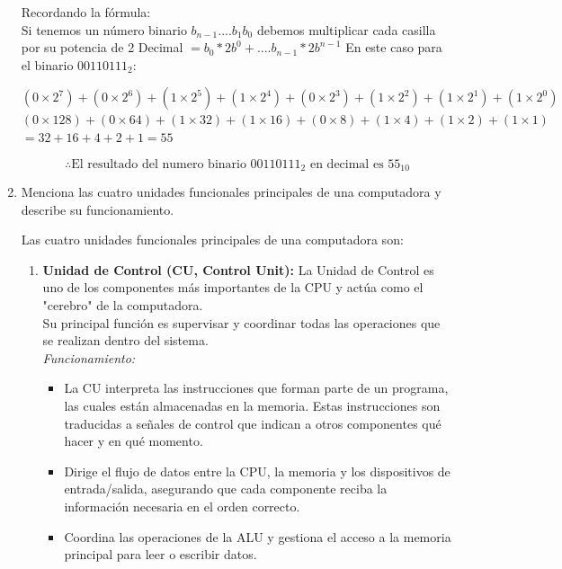 \documentclass[12pt,letterpaper]{article}
\begin{document}
\begin{enumerate}
    Recordando la f\'{o}rmula:\\
    Si tenemos un número binario $b_{n-1} .... b_1 b_0$ debemos multiplicar cada casilla por su potencia de 2
    Decimal $= b_0 * 2 b^0 + .... b_{n-1} * 2 b^{n-1}$
    En este caso para el binario $00110111_2$:
    
    \begin{center}
      $(0 × 2^7) + (0 × 2^6) + (1 × 2^5) + (1 × 2^4) + (0 × 2^3) + (1 × 2^2) + (1 × 2^1) + (1 × 2^0)$\\
      $(0 × 128) + (0 × 64) + (1 × 32) + (1 × 16) + (0 × 8) + (1 × 4) + (1 × 2) + (1 × 1)$\\
      $= 32 + 16 + 4 + 2 + 1 = 55$
    \end{center}

    \[
    \therefore \text{El resultado del numero binario } 00110111_2 \text{ en decimal es } 55_{10}
    \]
    
  \item Menciona las cuatro unidades funcionales principales de una computadora y describe su funcionamiento.
    \bigskip

    Las cuatro unidades funcionales principales de una computadora son:
    \begin{enumerate}[label=\arabic*)]
    \item \textbf{Unidad de Control (CU, Control Unit):}
      La Unidad de Control es uno de los componentes más importantes de la CPU y actúa como el "cerebro" de la computadora.\\
      Su principal función es supervisar y coordinar todas las operaciones que se realizan dentro del sistema.\\
      \textit{Funcionamiento:}
      \begin{itemize}
      \item La CU interpreta las instrucciones que forman parte de un programa, las cuales están almacenadas en la memoria.
        Estas instrucciones son traducidas a señales de control que indican a otros componentes qué hacer y en qué momento.
        
      \item Dirige el flujo de datos entre la CPU, la memoria y los dispositivos de entrada/salida, asegurando que cada componente reciba la información necesaria en el orden correcto.
        
      \item Coordina las operaciones de la ALU y gestiona el acceso a la memoria principal para leer o escribir datos.
        

\end{itemize}
\end{enumerate}
\end{enumerate}
\end{document}
